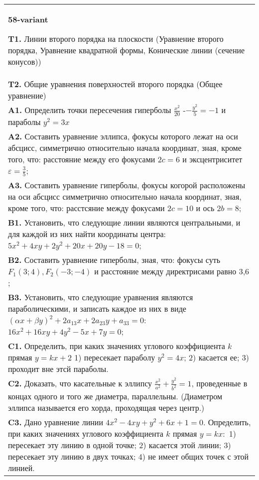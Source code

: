 \documentclass{article}
\begin{document}
\begin{tabular}{m{17cm}}
\textbf{58-variant}
\newline

\textbf{T1.} Линии второго порядка на плоскости (Уравнение второго порядка, Уравнение квадратной формы, Конические линии (сечение конусов)) \\
\textbf{T2.} Общие уравнения поверхностей второго порядка (Общее уравнение) \\
\textbf{A1.} Определить точки пересечения гиперболы $\frac{x^2}{20}$ -$-\frac{y^2}{5}=-1$ и параболы $y^2=3 x$ \\
\textbf{A2.} Составить уравнение эллипса, фокусы которого лежат на оси абсцисс, симметрично относительно начала координат, зная, кроме того, что: расстояние между его фокусами $2 c=6$ и эксцентриситет $\varepsilon=\frac{3}{5}$; \\
\textbf{A3.} Составить уравнение гиперболы, фокусы когорой расположены на оси абсцисс симметрично относительно начала координат, зная, кроме того, что: расстсяние между фокусами $2 c=10$ и ось $2 b=8$; \\
\textbf{B1.} Установить, что следующие линии являются центральными, и для каждой из них найти координаты центра: $5 x^2+4 x y+2 y^2+20 x+20 y-18=0$; \\
\textbf{B2.} Составить уравнение гиперболы, зная, что: фокусы суть $F_1(3 ; 4), F_2(-3 ;-4)$ и расстояние между директрисами равно 3,6 ; \\
\textbf{B3.} Установить, что следующие уравнения являются параболическими, и записать каждое из них в виде $(\alpha x+\beta y)^2+2 a_{13} x+2 a_{23} y+a_{33}=0$: $16 x^2+16 x y+4 y^2-5 x+7 y=0$; \\
\textbf{C1.} Определить, при каких значениях углового коэффициента $k$ прямая $y=k x+2$ 1) пересекает параболу $y^2=4 x$; 2) касается ее; 3) проходит вне этсй параболы. \\
\textbf{C2.} Доказать, что касательные к эллипсу $\frac{x^2}{a^2}+\frac{y^2}{b^2}=1$, проведенные в концах одного и того же диаметра, параллельны. (Диаметром эллипса называется его хорда, проходящая через центр.) \\
\textbf{C3.} Дано уравнение линии $4 x^2-4 x y+y^2+6 x+1=0$. Определить, при каких значениях углового коэффициента $k$ прямая $y=k x:$ 1) пересекает эту линию в одной точке; 2) касается этой линии; 3) пересекает эту линию в двух точках; 4) не имеет общих точек с этой линией. \\

\end{tabular}
\vspace{1cm}
\end{document}
